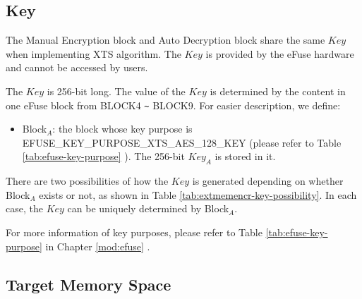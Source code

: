 \documentclass[main\_\_EN.tex]{subfiles}
\begin{document}
\subsection{Key} 
\label{sec:extmemncr-key}

The Manual Encryption block and Auto Decryption block share the same \begin{math}Key\end{math} when implementing XTS algorithm. The \begin{math}Key\end{math} is provided by the eFuse hardware and cannot be accessed by users.

The \begin{math}Key\end{math} is 256-bit long. The value of the \begin{math}Key\end{math} is determined by the content in one eFuse block from BLOCK4 \verb+~+ BLOCK9. For easier description, we define:
\begin{itemize}
\item Block$_A$: the block whose key purpose is EFUSE\_KEY\_PURPOSE\_XTS\_AES\_128\_KEY (please refer to Table \ref{tab:efuse-key-purpose} \textit{}). The 256-bit \begin{math}Key_{A}\end{math} is stored in it.
\end{itemize}

There are two possibilities of how the \begin{math}Key\end{math} is generated depending on whether Block$_A$ exists or not, as shown in Table \ref{tab:extmemencr-key-possibility}. In each case, the \begin{math}Key\end{math} can be uniquely determined by Block$_A$.



For more information of key purposes, please refer to Table \ref{tab:efuse-key-purpose} \textit{} in Chapter \ref{mod:efuse} \textit{}.

\subsection{Target Memory Space} 
\label{sec:extmemencr-target-space}
\end{document}
